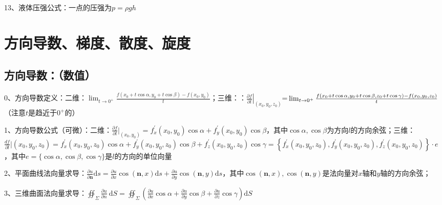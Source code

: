 13、液体压强公式：一点的压强为$p=\rho gh$

\section{方向导数、梯度、散度、旋度}



\subsection{方向导数：（数值）}

0、方向导数定义：二维：$\lim _{t \rightarrow 0^{+}} \frac{f\left(x_{0}+t \cos \alpha, y_{0}+t \cos \beta\right)-f\left(x_{0}, y_{0}\right)}{t}$；三维：：$\left.\frac{\partial f}{\partial l}\right|_{\left(x_{0}, y_{0}, z_{0}\right)}$=$\newline\lim _{t \rightarrow 0^{+}} \frac{f\left(x_{0}+t \cos \alpha, y_{0}+t \cos \beta, z_{0}+t \cos \gamma\right)-f\left(x_{0}, y_{0}, z_{0}\right)}{t}$（注意$t$是趋近于$0^+$的）

1、方向导数公式（可微）：二维：$\frac{\partial f}{\partial l}|_{\left(x_{0}, y_{0}\right)}= f_{x}^{\prime}(x_{0},y_{0}) \cos \alpha+f_{y}^{\prime}\left(x_{0}, y_{0}\right) \cos \beta$，其中$\cos \alpha, \cos \beta$为方向$l$的方向余弦；三维：$\frac{d f}{\partial l}|{\left(x_{0}, y_{0}, z_{0}\right)} =f_{x}^{\prime}\left(x_{0}, y_{0}, z_{0}\right) \cos \alpha+f_{y}^{\prime}\left(x_{0}, y_{0}, z_{0}\right) \cos \beta+f_{z}^{\prime}\left(x_{0}, y_{0}, z_{0}\right) \cos \gamma =\left\{f_{x}^{\prime}\left(x_{0}, y_{0}, z_{0}\right), f_{y}^{\prime}\left(x_{0}, y_{0}, z_{0}\right), f_{z}^{\prime}\left(x_{0}, y_{0}, z_{0}\right)\right\} \cdot e$，其中$e=\{\cos \alpha, \cos \beta, \cos \gamma\}$是$l$的方向的单位向量

2、平面曲线法向量求导：$\frac{\partial u}{\partial \boldsymbol{n}} \mathrm{d} s=\frac{\partial u}{\partial x} \cos (\boldsymbol{n}, x) \mathrm{d} s+\frac{\partial u}{\partial y} \cos (\boldsymbol{n}, y) \mathrm{d} s$，其中$\cos (\boldsymbol{n}, x) ,\cos (\boldsymbol{n}, y)$是法向量对$x$轴和$y$轴的方向余弦；

3、三维曲面法向量求导：$\oiint_{\Sigma} \frac{\partial u}{\partial n} \mathrm{~d} S=\oiint_{\Sigma}\left(\frac{\partial u}{\partial x} \cos \alpha+\frac{\partial u}{\partial y} \cos \beta+\frac{\partial u}{\partial z} \cos \gamma\right) \mathrm{d} S$



